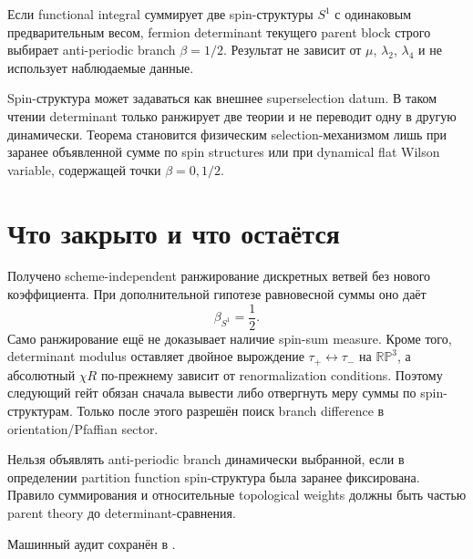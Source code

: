 \begin{theorem}
Если functional integral суммирует две spin-структуры \(S^1\) с одинаковым
предварительным весом, fermion determinant текущего parent block строго
выбирает anti-periodic branch \(\beta=1/2\). Результат не зависит от
\(\mu\), \(\lambda_2\), \(\lambda_4\) и не использует наблюдаемые данные.
\end{theorem}

\begin{remark}
Spin-структура может задаваться как внешнее superselection datum. В таком
чтении determinant только ранжирует две теории и не переводит одну в
другую динамически. Теорема становится физическим selection-механизмом
лишь при заранее объявленной сумме по spin structures или при dynamical
flat Wilson variable, содержащей точки \(\beta=0,1/2\).
\end{remark}

\section{Что закрыто и что остаётся}

Получено scheme-independent ранжирование дискретных ветвей без нового
коэффициента. При дополнительной гипотезе равновесной суммы оно даёт
\begin{equation}
 \boxed{\beta_{S^1}=\frac12.}
\end{equation}
Само ранжирование ещё не доказывает наличие spin-sum measure. Кроме того,
determinant modulus оставляет двойное вырождение
\(\tau_+\leftrightarrow\tau_-\) на \(\mathbb{RP}^3\), а абсолютный
\(\chi R\) по-прежнему зависит от renormalization conditions. Поэтому
следующий гейт обязан сначала вывести либо отвергнуть меру суммы по
spin-структурам. Только после этого разрешён поиск branch difference в
orientation/Pfaffian sector.

\begin{nogocriterion}
Нельзя объявлять anti-periodic branch динамически выбранной, если в
определении partition function spin-структура была заранее фиксирована.
Правило суммирования и относительные topological weights должны быть частью
parent theory до determinant-сравнения.
\end{nogocriterion}

Машинный аудит сохранён в
.